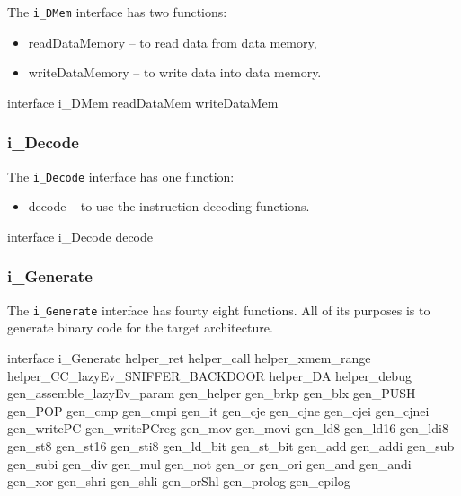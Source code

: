 \documentclass[11pt]{report}
\begin{document}
			\par The \texttt{i\_DMem} interface has two functions:
			\begin{itemize}
				\item readDataMemory -- to read data from data memory,
				\item writeDataMemory -- to write data into data memory.
			\end{itemize}
			
			\begin{EL}
			interface i_DMem {
				readDataMem	 	
				writeDataMem
			}
			\end{EL}			
			
			\subsubsection*{i\_Decode}
			
			\par The \texttt{i\_Decode} interface has one function:
			\begin{itemize}
				\item decode -- to use the instruction decoding functions.
			\end{itemize}
			
			\begin{EL}
			interface i_Decode {
				decode 
			}
			\end{EL}	
					
			\subsubsection*{i\_Generate}
			
			\par The \texttt{i\_Generate} interface has fourty eight functions. All of its purposes is to generate binary code for the target architecture.
			
			\begin{EL}
			interface i_Generate {
				helper_ret	helper_call	helper_xmem_range	
				helper_CC_lazyEv_SNIFFER_BACKDOOR	helper_DA	
				helper_debug
				gen_assemble_lazyEv_param
				gen_helper	
				gen_brkp  	gen_blx
				gen_PUSH  	gen_POP
				gen_cmp 	gen_cmpi
				gen_it  
				gen_cje  	gen_cjne	gen_cjei  	gen_cjnei
				gen_writePC gen_writePCreg
				gen_mov  	gen_movi
				gen_ld8  	gen_ld16  gen_ldi8
				gen_st8	 	gen_st16  gen_sti8
				gen_ld_bit  gen_st_bit
				gen_add  	gen_addi
				gen_sub  	gen_subi
				gen_div  	gen_mul
				gen_not
				gen_or  	gen_ori
				gen_and  	gen_andi
				gen_xor
				gen_shri 	gen_shli
				gen_orShl
				gen_prolog  gen_epilog
			}
			\end{EL}
			
\end{document}
